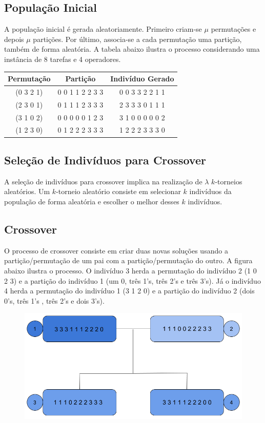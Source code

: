 \documentclass{article}
\begin{document}
\subsection{População Inicial}
\quad A população inicial é gerada aleatoriamente. Primeiro criam-se $\mu$ permutações e depois $\mu$ partições. Por último, associa-se a cada permutação uma partição, também de forma aleatória. A tabela abaixo ilustra o processo considerando uma instância de 8 tarefas e 4 operadores.
\begin{table}[!]
\centering
\begin{tabular}{ccc}
\hline
\textbf{Permutação} & \textbf{Partição} & \textbf{Indivíduo Gerado} \\ \hline
(0 3 2 1) & 0 0 1 1 2 2 3 3 & 0 0 3 3 2 2 1 1 \\ \hline
(2 3 0 1) & 0 1 1 1 2 3 3 3 & 2 3 3 3 0 1 1 1 \\ \hline
(3 1 0 2) & 0 0 0 0 0 1 2 3 & 3 1 0 0 0 0 0 2 \\ \hline
(1 2 3 0) & 0 1 2 2 2 3 3 3 & 1 2 2 2 3 3 3 0 \\ \hline
\end{tabular}
\end{table}
\newpage
\subsection{Seleção de Indivíduos para Crossover}
\quad A seleção de indivíduos para crossover implica na realização de $\lambda$ $k$-torneios aleatórios. Um $k$-torneio aleatório consiste em selecionar $k$ indivíduos da população de forma aleatória e escolher o melhor desses $k$ indivíduos. 
\subsection{Crossover}
\quad O processo de crossover consiste em criar duas novas soluções usando a partição/permutação de um pai com a partição/permutação do outro. A figura abaixo ilustra o processo. O indivíduo 3 herda a permutação do indivíduo 2 (1 0 2 3)  e a partição do indivíduo 1 (um 0, três 1's, três 2's e três 3's). Já o indivíduo 4 herda a permutação do indivíduo 1 (3 1 2 0) e a partição do indivíduo 2 (dois 0's, três 1's , três 2's e dois 3's).
\begin{figure}[tph!]
\centering
\includegraphics[scale=0.35]{figure2}
\end{figure}
\end{document}
